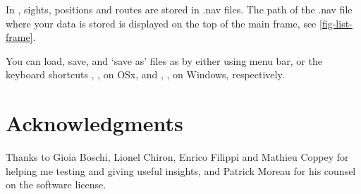 \documentclass{ol-softwaremanual}
\makeatletter
\def\setmenukeyswin{\def\tw@mk@os{win}}
\def\setmenukeysmac{\def\tw@mk@os{mac}}
\makeatother
\begin{document}
In \thel, \glspl{sight}, \glspl{position} and \glspl{route} are stored in .nav files. The path of the .nav file where your data is stored is displayed on the top of the main frame, see \cref{fig-list-frame}. 








You can load, save, and `save as' files as by either using \thel menu bar, or the keyboard shortcuts 
\setmenukeysmac
{}, ,  on OSx, and  
\setmenukeyswin
{}, ,  on Windows, respectively.  


\pagebreak

\section*{Acknowledgments}

Thanks to Gioia Boschi, Lionel Chiron, Enrico Filippi and Mathieu Coppey for helping me testing \thel and giving useful insights, and Patrick Moreau for his counsel on the software license. 

\printacronyms[pages={display=all,seq/use=false}]

\printnoidxglossary



\end{document}
